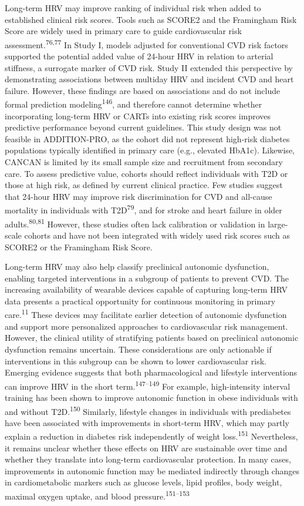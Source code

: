 \documentclass[
  a4paper,
  headsepline=true,
  open=left]{scrbook}
\begin{document}
Long-term HRV may improve ranking of individual risk when added to
established clinical risk scores. Tools such as SCORE2 and the
Framingham Risk Score are widely used in primary care to guide
cardiovascular risk assessment.\textsuperscript{76,77} In Study I,
models adjusted for conventional CVD risk factors supported the
potential added value of 24-hour HRV in relation to arterial stiffness,
a surrogate marker of CVD risk. Study II extended this perspective by
demonstrating associations between multiday HRV and incident CVD and
heart failure. However, these findings are based on associations and do
not include formal prediction modeling\textsuperscript{146}, and
therefore cannot determine whether incorporating long-term HRV or CARTs
into existing risk scores improves predictive performance beyond current
guidelines. This study design was not feasible in ADDITION-PRO, as the
cohort did not represent high-risk diabetes populations typically
identified in primary care (e.g., elevated HbA1c). Likewise, CANCAN is
limited by its small sample size and recruitment from secondary care. To
assess predictive value, cohorts should reflect individuals with T2D or
those at high risk, as defined by current clinical practice. Few studies
suggest that 24-hour HRV may improve risk discrimination for CVD and
all-cause mortality in individuals with T2D\textsuperscript{79}, and for
stroke and heart failure in older adults.\textsuperscript{80,81}
However, these studies often lack calibration or validation in
large-scale cohorts and have not been integrated with widely used risk
scores such as SCORE2 or the Framingham Risk Score.

Long-term HRV may also help classify preclinical autonomic dysfunction,
enabling targeted interventions in a subgroup of patients to prevent
CVD. The increasing availability of wearable devices capable of
capturing long-term HRV data presents a practical opportunity for
continuous monitoring in primary care.\textsuperscript{11} These devices
may facilitate earlier detection of autonomic dysfunction and support
more personalized approaches to cardiovascular risk management. However,
the clinical utility of stratifying patients based on preclinical
autonomic dysfunction remains uncertain. These considerations are only
actionable if interventions in this subgroup can be shown to lower
cardiovascular risk. Emerging evidence suggests that both
pharmacological and lifestyle interventions can improve HRV in the short
term.\textsuperscript{147--149} For example, high-intensity interval
training has been shown to improve autonomic function in obese
individuals with and without T2D.\textsuperscript{150} Similarly,
lifestyle changes in individuals with prediabetes have been associated
with improvements in short-term HRV, which may partly explain a
reduction in diabetes risk independently of weight
loss.\textsuperscript{151} Nevertheless, it remains unclear whether
these effects on HRV are sustainable over time and whether they
translate into long-term cardiovascular protection. In many cases,
improvements in autonomic function may be mediated indirectly through
changes in cardiometabolic markers such as glucose levels, lipid
profiles, body weight, maximal oxygen uptake, and blood
pressure.\textsuperscript{151--153}
\end{document}
